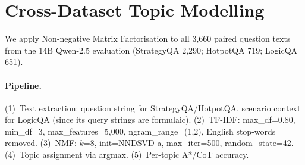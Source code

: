 \documentclass{article}
\begin{document}


\section{Cross-Dataset Topic Modelling}
\label{app:topics}

We apply Non-negative Matrix Factorisation \citep[NMF;][]{lee1999learning} to all 3,660 paired question texts from the 14B Qwen-2.5 evaluation (StrategyQA 2,290; HotpotQA 719; LogicQA 651).

\paragraph{Pipeline.} (1)~Text extraction: question string for StrategyQA/HotpotQA, scenario context for LogicQA (since its query strings are formulaic). (2)~TF-IDF: max\_df=0.80, min\_df=3, max\_features=5,000, ngram\_range=(1,2), English stop-words removed. (3)~NMF: $k$=8, init=NNDSVD-a, max\_iter=500, random\_state=42. (4)~Topic assignment via argmax. (5)~Per-topic A*/CoT accuracy.
\end{document}
